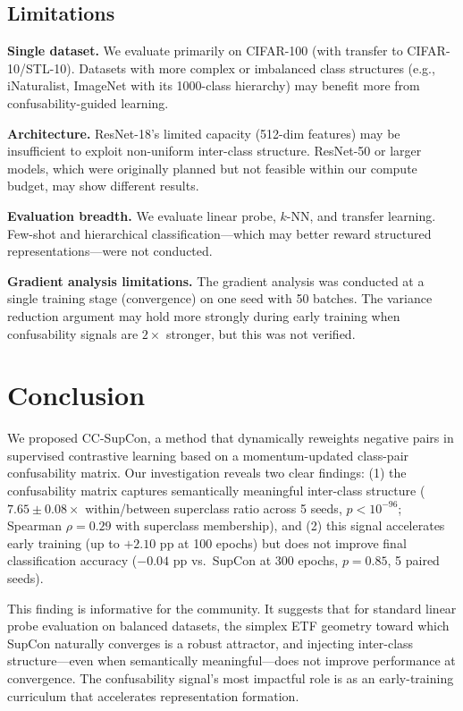 \documentclass{article}
\begin{document}
\subsection{Limitations}

\textbf{Single dataset.} We evaluate primarily on CIFAR-100 (with transfer to CIFAR-10/STL-10). Datasets with more complex or imbalanced class structures (e.g., iNaturalist, ImageNet with its 1000-class hierarchy) may benefit more from confusability-guided learning.

\textbf{Architecture.} ResNet-18's limited capacity (512-dim features) may be insufficient to exploit non-uniform inter-class structure. ResNet-50 or larger models, which were originally planned but not feasible within our compute budget, may show different results.

\textbf{Evaluation breadth.} We evaluate linear probe, $k$-NN, and transfer learning. Few-shot and hierarchical classification---which may better reward structured representations---were not conducted.

\textbf{Gradient analysis limitations.} The gradient analysis was conducted at a single training stage (convergence) on one seed with 50 batches. The variance reduction argument may hold more strongly during early training when confusability signals are $2\times$ stronger, but this was not verified.


\section{Conclusion}
\label{sec:conclusion}

We proposed CC-SupCon, a method that dynamically reweights negative pairs in supervised contrastive learning based on a momentum-updated class-pair confusability matrix. Our investigation reveals two clear findings: (1) the confusability matrix captures semantically meaningful inter-class structure ($7.65 \pm 0.08\times$ within/between superclass ratio across 5 seeds, $p < 10^{-96}$; Spearman $\rho = 0.29$ with superclass membership), and (2) this signal accelerates early training (up to $+2.10$ pp at 100 epochs) but does not improve final classification accuracy ($-0.04$ pp vs.\ SupCon at 300 epochs, $p = 0.85$, 5 paired seeds).

This finding is informative for the community. It suggests that for standard linear probe evaluation on balanced datasets, the simplex ETF geometry toward which SupCon naturally converges is a robust attractor, and injecting inter-class structure---even when semantically meaningful---does not improve performance at convergence. The confusability signal's most impactful role is as an early-training curriculum that accelerates representation formation.
\end{document}
